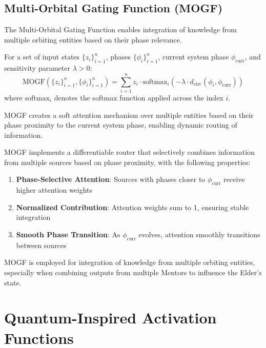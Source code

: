 \subsection{Multi-Orbital Gating Function (MOGF)}

The Multi-Orbital Gating Function enables integration of knowledge from multiple orbiting entities based on their phase relevance.

\begin{definition}
For a set of input states $\{z_i\}_{i=1}^n$, phases $\{\phi_i\}_{i=1}^n$, current system phase $\phi_{\text{curr}}$, and sensitivity parameter $\lambda > 0$:
\begin{equation}
\text{MOGF}(\{z_i\}_{i=1}^n, \{\phi_i\}_{i=1}^n) = \sum_{i=1}^n z_i \cdot \text{softmax}_i(-\lambda \cdot d_{\text{circ}}(\phi_i, \phi_{\text{curr}}))
\end{equation}
where $\text{softmax}_i$ denotes the softmax function applied across the index $i$.
\end{definition}

MOGF creates a soft attention mechanism over multiple entities based on their phase proximity to the current system phase, enabling dynamic routing of information.

\begin{theorem}
MOGF implements a differentiable router that selectively combines information from multiple sources based on phase proximity, with the following properties:
\begin{enumerate}
    \item \textbf{Phase-Selective Attention}: Sources with phases closer to $\phi_{\text{curr}}$ receive higher attention weights
    \item \textbf{Normalized Contribution}: Attention weights sum to 1, ensuring stable integration
    \item \textbf{Smooth Phase Transition}: As $\phi_{\text{curr}}$ evolves, attention smoothly transitions between sources
\end{enumerate}
\end{theorem}

MOGF is employed for integration of knowledge from multiple orbiting entities, especially when combining outputs from multiple Mentors to influence the Elder's state.

\section{Quantum-Inspired Activation Functions}

